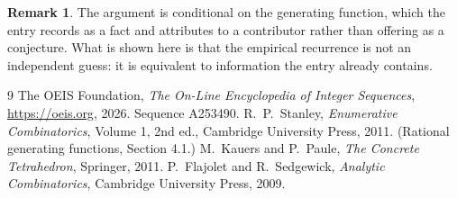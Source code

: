 \documentclass[11pt,a4paper]{article}
\theoremstyle{plain}
\theoremstyle{definition}
\newtheorem{remark}[theorem]{Remark}
\begin{document}
\begin{remark}
The argument is conditional on the generating function, which the entry records as a fact and
attributes to a contributor rather than offering as a conjecture. What is shown here is that
the empirical recurrence is not an independent guess: it is equivalent to information the
entry already contains.
\end{remark}

\begin{thebibliography}{9}
 The OEIS Foundation, \emph{The On-Line Encyclopedia of Integer
Sequences}, \url{https://oeis.org}, 2026. Sequence A253490.
 R.~P.~Stanley, \emph{Enumerative Combinatorics}, Volume 1, 2nd ed.,
Cambridge University Press, 2011. (Rational generating functions, Section 4.1.)
 M.~Kauers and P.~Paule, \emph{The Concrete Tetrahedron}, Springer, 2011.
 P.~Flajolet and R.~Sedgewick, \emph{Analytic Combinatorics}, Cambridge
University Press, 2009.
\end{thebibliography}
\end{document}
